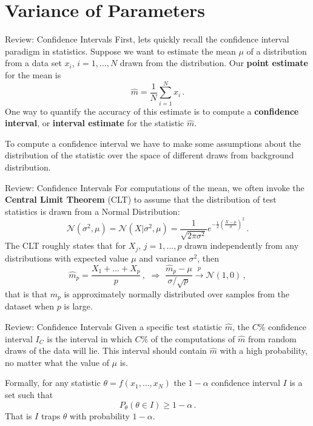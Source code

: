 \documentclass[10pt, table, dvipsnames,xcdraw, handout ]{beamer}
\begin{document}
\section{Variance of Parameters}


\begin{frame}[fragile]{Review: Confidence Intervals}
First, lets quickly recall the confidence interval paradigm in statistics. Suppose we want to estimate the mean $\mu$ of a distribution from a data set $x_i$, $i=1,\ldots, N$ drawn from the distribution. Our \textbf{point estimate} for the mean is 
$$
\hat{m} = \frac{1}{N}\sum_{i=1}^N x_i\,.
$$
One way to quantify the accuracy of this estimate is to compute a \textbf{confidence interval}, or \textbf{interval estimate} for the statistic $\hat{m}$. \pause

To compute a confidence interval we have to make some assumptions about the distribution of the statistic over the space of different draws from background distribution. 

\end{frame}



\begin{frame}[fragile]{Review: Confidence Intervals}
For computations of the mean, we often invoke the \textbf{Central Limit Theorem} (CLT) to assume that the distribution of test statistics is drawn from a Normal Distribution:
$$
\mathcal{N}(\sigma^2, \mu)  = \mathcal{N}(X|\sigma^2, \mu) = \frac{1}{\sqrt{2\pi \sigma^2}}e^{-\frac12\left(\frac{X-\mu}{\sigma}\right)^2}\,.
$$\pause
The CLT roughly states that for $X_j$, $j=1,\ldots, p$ drawn independently from any distributions with expected value $\mu$ and variance $\sigma^2$, then 
$$
\hat{m}_p = \frac{X_1+\ldots +X_p}{p}\,,\,\, \Rightarrow \,\, \frac{\hat{m}_p - \mu}{\sigma/\sqrt{p}} \xrightarrow{p} \mathcal{N}\left(1, 0\right) \,,
$$
that is that $m_p$ is approximately normally distributed over samples from the dataset when $p$ is large. 
\end{frame}



\begin{frame}[fragile]{Review: Confidence Intervals}
Given a specific test statistic $\hat{m}$, the $C\%$ confidence interval $I_C$ is the interval in which $C\%$ of the computations of $\hat{m}$ from random draws of the data will lie. This interval should contain $\hat{m}$ with a high probability, no matter what the value of $\mu$ is. \pause 

Formally, for any statistic $\theta = f(x_1,\ldots, x_N)$ the $1-\alpha$ confidence interval $I$ is a set such that
$$
P_{\theta} (\theta \in I)  \geq 1-\alpha\,.
$$
That is $I$ traps $\theta$ with probability $1-\alpha$. 
\end{frame}
\end{document}
